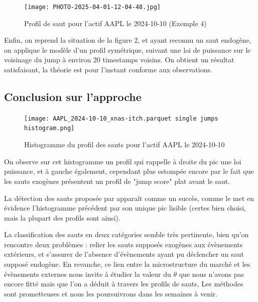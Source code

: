 \documentclass[10pt,a4paper]{article}
\theoremstyle{definition}
\theoremstyle{remark}
\begin{document}
    \vspace{1cm}

    \begin{figure}[H]
        \centering
        \texttt{[image: PHOTO-2025-04-01-12-04-48.jpg]}
        \caption{Profil de saut pour l'actif AAPL le 2024-10-10 (Exemple 4)}
        \label{fig:jump_example_4}
    \end{figure}

    Enfin, on reprend la situation de la figure 2, et ayant reconnu un saut endogène, on applique le modèle d'un profil symétrique, suivant une loi de puissance sur le voisinage du jump à environ 20 timestamps voisins. On obtient un résultat satisfaisant, la théorie est pour l'instant conforme aux observations.
    
    \subsection{Conclusion sur l'approche}

    \begin{figure}[H]
        \centering
        \texttt{[image: AAPL\_2024-10-10\_xnas-itch.parquet single jumps histogram.png]}
        \caption{Histogramme du profil des sauts pour l'actif AAPL le 2024-10-10}
        \label{fig:jump_example_4}
    \end{figure}

    On observe sur cet histogramme un profil qui rappelle à droite du pic une loi puissance, et à gauche également, cependant plus estompée encore par le fait que les sauts exogènes présentent un profil de "jump score" plat avant le saut.
    \vspace{0.3cm}

    La détection des sauts proposée par \cite{marcaccioli2021exogenous} apparaît comme un succès, comme le met en évidence l'histogramme précédent par son unique pic lisible (certes bien choisi, mais la plupart des profils sont ainsi).
    \vspace{0.3cm}

    La classification des sauts en deux catégories semble très pertinente, bien qu'on rencontre deux problèmes : relier les sauts supposés exogènes aux évènements extérieurs, et s'assurer de l'absence d'évènements ayant pu déclencher un saut supposé endogène. En revanche, ce lien entre la microstructure du marché et les évènements externes nous invite à étudier la valeur du $\theta$ que nous n'avons pas encore fitté mais que l'on a déduit à travers les profils de sauts, Les méthodes sont prometteuses et nous les poursuivrons dans les semaines à venir.
    
\end{document}

